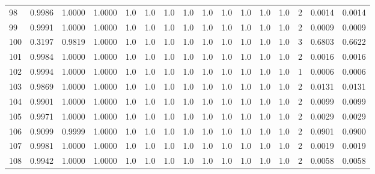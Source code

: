 \begin{tabular}{lrrrrrrrrrrrrrrr}
98  &      0.9986 &  1.0000 &  1.0000 &     1.0 &     1.0 &     1.0 &     1.0 &     1.0 &     1.0 &     1.0 &      1.0 &        1.0 &      2 &                    0.0014 &                     0.0014 \\
99  &      0.9991 &  1.0000 &  1.0000 &     1.0 &     1.0 &     1.0 &     1.0 &     1.0 &     1.0 &     1.0 &      1.0 &        1.0 &      2 &                    0.0009 &                     0.0009 \\
100 &      0.3197 &  0.9819 &  1.0000 &     1.0 &     1.0 &     1.0 &     1.0 &     1.0 &     1.0 &     1.0 &      1.0 &        1.0 &      3 &                    0.6803 &                     0.6622 \\
101 &      0.9984 &  1.0000 &  1.0000 &     1.0 &     1.0 &     1.0 &     1.0 &     1.0 &     1.0 &     1.0 &      1.0 &        1.0 &      2 &                    0.0016 &                     0.0016 \\
102 &      0.9994 &  1.0000 &  1.0000 &     1.0 &     1.0 &     1.0 &     1.0 &     1.0 &     1.0 &     1.0 &      1.0 &        1.0 &      1 &                    0.0006 &                     0.0006 \\
103 &      0.9869 &  1.0000 &  1.0000 &     1.0 &     1.0 &     1.0 &     1.0 &     1.0 &     1.0 &     1.0 &      1.0 &        1.0 &      2 &                    0.0131 &                     0.0131 \\
104 &      0.9901 &  1.0000 &  1.0000 &     1.0 &     1.0 &     1.0 &     1.0 &     1.0 &     1.0 &     1.0 &      1.0 &        1.0 &      2 &                    0.0099 &                     0.0099 \\
105 &      0.9971 &  1.0000 &  1.0000 &     1.0 &     1.0 &     1.0 &     1.0 &     1.0 &     1.0 &     1.0 &      1.0 &        1.0 &      2 &                    0.0029 &                     0.0029 \\
106 &      0.9099 &  0.9999 &  1.0000 &     1.0 &     1.0 &     1.0 &     1.0 &     1.0 &     1.0 &     1.0 &      1.0 &        1.0 &      2 &                    0.0901 &                     0.0900 \\
107 &      0.9981 &  1.0000 &  1.0000 &     1.0 &     1.0 &     1.0 &     1.0 &     1.0 &     1.0 &     1.0 &      1.0 &        1.0 &      2 &                    0.0019 &                     0.0019 \\
108 &      0.9942 &  1.0000 &  1.0000 &     1.0 &     1.0 &     1.0 &     1.0 &     1.0 &     1.0 &     1.0 &      1.0 &        1.0 &      2 &                    0.0058 &                     0.0058 \\

\end{tabular}
